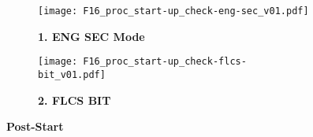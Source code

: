 \begin{figure}[h]
    \centering
    \begin{subfigure}[t]{0.45\linewidth}
        \centering
        \texttt{[image: F16\_proc\_start-up\_check-eng-sec\_v01.pdf]}
        \caption*{\textbf{1. ENG SEC Mode}}
    \end{subfigure}
    \begin{subfigure}[t]{0.45\linewidth}
        \centering
        \texttt{[image: F16\_proc\_start-up\_check-flcs-bit\_v01.pdf]}
        \caption*{\textbf{2. FLCS BIT}}
    \end{subfigure}
    \caption{\textbf{Post-Start}}
    \label{fig:proc:testschecks1}
\end{figure}

\clearpage

